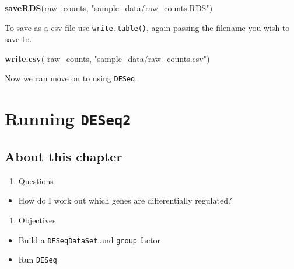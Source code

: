 \documentclass[]{book}
\newenvironment{Shaded}{\begin{snugshade}}{\end{snugshade}}
\newcommand{\KeywordTok}[1]{\textcolor[rgb]{0.13,0.29,0.53}{\textbf{#1}}}
\newcommand{\NormalTok}[1]{#1}
\newcommand{\StringTok}[1]{\textcolor[rgb]{0.31,0.60,0.02}{#1}}
\providecommand{\tightlist}{%
  \setlength{\itemsep}{0pt}\setlength{\parskip}{0pt}}
\begin{document}
\begin{Shaded}
\begin{Highlighting}[]
\KeywordTok{saveRDS}\NormalTok{(raw_counts, }\StringTok{"sample_data/raw_counts.RDS"}\NormalTok{)}
\end{Highlighting}
\end{Shaded}

To save as a csv file use \texttt{write.table()}, again passing the filename you wish to save to.

\begin{Shaded}
\begin{Highlighting}[]
\KeywordTok{write.csv}\NormalTok{( raw_counts, }\StringTok{"sample_data/raw_counts.csv"}\NormalTok{)}
\end{Highlighting}
\end{Shaded}

Now we can move on to using \texttt{DESeq}.

\hypertarget{running-deseq2}{%
\chapter{\texorpdfstring{Running \texttt{DESeq2}}{Running DESeq2}}\label{running-deseq2}}

\hypertarget{about-this-chapter-1}{%
\section{About this chapter}\label{about-this-chapter-1}}

\begin{enumerate}
\def\labelenumi{\arabic{enumi}.}
\tightlist
\item
  Questions
\end{enumerate}

\begin{itemize}
\tightlist
\item
  How do I work out which genes are differentially regulated?
\end{itemize}

\begin{enumerate}
\def\labelenumi{\arabic{enumi}.}
\setcounter{enumi}{1}
\tightlist
\item
  Objectives
\end{enumerate}

\begin{itemize}
\tightlist
\item
  Build a \texttt{DESeqDataSet} and \texttt{group} factor
\item
  Run \texttt{DESeq}
\end{itemize}
\end{document}
